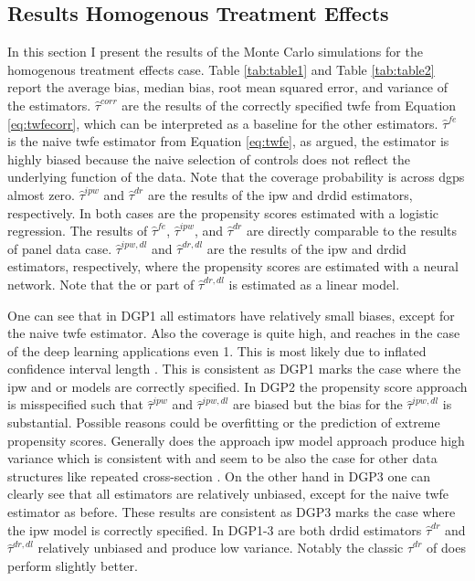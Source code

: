 \subsection{Results Homogenous Treatment Effects}



In this section I present the results of the Monte Carlo simulations for the homogenous treatment effects case.
Table \ref{tab:table1} and Table \ref{tab:table2} report the average bias, median bias, root mean squared error, and variance of the estimators.
$\hat{\tau}^{corr}$ are the results of the correctly specified \ac{twfe} from Equation \ref{eq:twfecorr}, which can be interpreted as a baseline for the other estimators.
$\hat{\tau}^{fe}$ is the naive \ac{twfe} estimator from Equation \ref{eq:twfe}, as argued, the estimator is highly biased because the naive selection of controls does not reflect the underlying function of the data.
Note that the coverage probability is across \ac{dgp}s almost zero.
$\hat{\tau}^{ipw}$ and $\hat{\tau}^{dr}$ are the results of the \ac{ipw} and \ac{drdid} estimators, respectively.
In both cases are the propensity scores estimated with a logistic regression.
The results of $\hat{\tau}^{fe}$, $\hat{\tau}^{ipw}$, and $\hat{\tau}^{dr}$ are directly comparable to the results of \citet{santannaDoublyRobustDifferenceindifferences2020} panel data case.
$\hat{\tau}^{ipw,dl}$ and $\hat{\tau}^{dr,dl}$ are the results of the \ac{ipw} and \ac{drdid} estimators, respectively, where the propensity scores are estimated with a neural network.
Note that the \ac{or} part of $\hat{\tau}^{dr,dl}$ is estimated as a linear model.

One can see that in DGP1 all estimators have relatively small biases, except for the naive \ac{twfe} estimator.
Also the coverage is quite high, and reaches in the case of the deep learning applications even 1.
This is most likely due to inflated confidence interval length \citep{farrellDeepNeuralNetworks2021}.
This is consistent as DGP1 marks the case where the \ac{ipw} and \ac{or} models are correctly specified.
In DGP2 the propensity score approach is misspecified such that $\hat{\tau}^{ipw}$ and $\hat{\tau}^{ipw,dl}$ are biased but the bias for the  $\hat{\tau}^{ipw,dl}$ is substantial.
Possible reasons could be overfitting or the prediction of extreme propensity scores.
Generally does the approach \ac{ipw} model approach produce high variance which is consistent with \citet{santannaDoublyRobustDifferenceindifferences2020} and seem to be also the case for other data structures like repeated cross-section \citep{santannaDoublyRobustDifferenceindifferences2020,manfeDifferenceInDifferenceDesignRepeated}.
On the other hand in DGP3 one can clearly see that all estimators are relatively unbiased, except for the naive \ac{twfe} estimator as before.
These results are consistent as DGP3 marks the case where the \ac{ipw} model is correctly specified.
In DGP1-3 are both \ac{drdid} estimators $\hat{\tau}^{dr}$ and $\hat{\tau}^{dr,dl}$ relatively unbiased and produce low variance.
Notably the classic $\hat{\tau}^{dr}$ of \citet{santannaDoublyRobustDifferenceindifferences2020} does perform slightly better.

